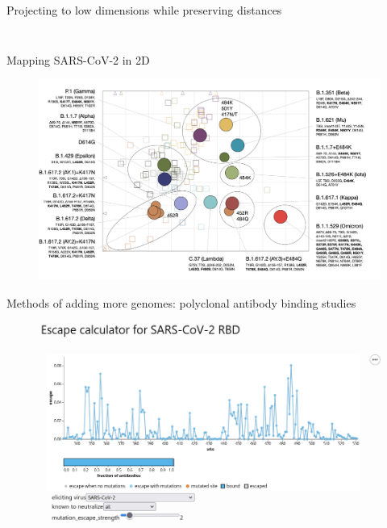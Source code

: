 \documentclass{beamer}
\begin{document}
\begin{frame}{Projecting to low dimensions while preserving distances}
\begin{columns}
\begin{column}{0.4\textwidth}
\begin{figure}
        \end{figure}   
        \end{column}
    \end{columns}
    \centering
    \tiny{\cite{scikit-learn}}
\end{frame}     


\begin{frame}{Mapping SARS-CoV-2 in 2D}
    \begin{figure}
    \includegraphics[width=\textwidth]{sars_cov_2_map/wilks_3.png}
\end{figure}   
\centering
\vfill
\tiny{\cite{wilksMappingSARSCoV2Antigenic2022}}
\end{frame}

\begin{frame}{Methods of adding more genomes: polyclonal antibody binding studies}
    \begin{figure}
        \includegraphics[width=\textwidth]{standalone/2022-07-06-13-06-32.png}
    \end{figure}
    \centering
\vfill
\tiny{\cite{greaney2022antibody}}
\end{frame}
\end{document}
